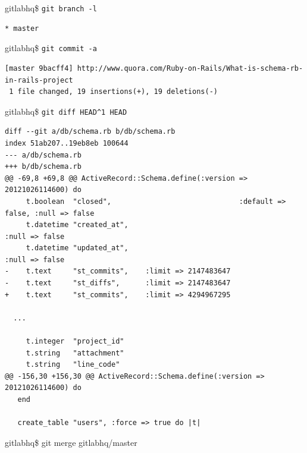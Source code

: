 \documentclass[times, utf8, seminar]{fit}
\begin{document}
gitlabhq\$ \verb+git branch -l+
\begin{lstlisting}
* master
\end{lstlisting}


gitlabhq\$ \verb+git commit -a+
\begin{lstlisting}
[master 9bacff4] http://www.quora.com/Ruby-on-Rails/What-is-schema-rb-in-rails-project
 1 file changed, 19 insertions(+), 19 deletions(-)
\end{lstlisting}



gitlabhq\$ \verb+git diff HEAD^1 HEAD+
\begin{lstlisting}
diff --git a/db/schema.rb b/db/schema.rb
index 51ab207..19eb8eb 100644
--- a/db/schema.rb
+++ b/db/schema.rb
@@ -69,8 +69,8 @@ ActiveRecord::Schema.define(:version => 20121026114600) do
     t.boolean  "closed",                              :default => false, :null => false
     t.datetime "created_at",                                             :null => false
     t.datetime "updated_at",                                             :null => false
-    t.text     "st_commits",    :limit => 2147483647
-    t.text     "st_diffs",      :limit => 2147483647
+    t.text     "st_commits",    :limit => 4294967295

  ...

     t.integer  "project_id"
     t.string   "attachment"
     t.string   "line_code"
@@ -156,30 +156,30 @@ ActiveRecord::Schema.define(:version => 20121026114600) do
   end
 
   create_table "users", :force => true do |t|
\end{lstlisting}


gitlabhq\$ git merge gitlabhq/master
\end{document}
